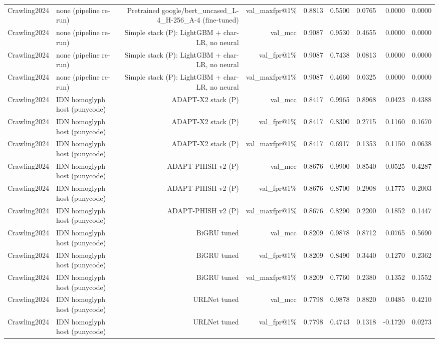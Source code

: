 \begin{table}[t]
\begin{tabular}{llrrrrrrr}
Crawling2024 & none (pipeline re-run) & Pretrained google/bert\_uncased\_L-4\_H-256\_A-4 (fine-tuned) & val\_maxfpr@1\% & 0.8813 & 0.5500 & 0.0765 & 0.0000 & 0.0000 \\
Crawling2024 & none (pipeline re-run) & Simple stack (P): LightGBM + char-LR, no neural & val\_mcc & 0.9087 & 0.9530 & 0.4655 & 0.0000 & 0.0000 \\
Crawling2024 & none (pipeline re-run) & Simple stack (P): LightGBM + char-LR, no neural & val\_fpr@1\% & 0.9087 & 0.7438 & 0.0813 & 0.0000 & 0.0000 \\
Crawling2024 & none (pipeline re-run) & Simple stack (P): LightGBM + char-LR, no neural & val\_maxfpr@1\% & 0.9087 & 0.4660 & 0.0325 & 0.0000 & 0.0000 \\
Crawling2024 & IDN homoglyph host (punycode) & ADAPT-X2 stack (P) & val\_mcc & 0.8417 & 0.9965 & 0.8968 & 0.0423 & 0.4388 \\
Crawling2024 & IDN homoglyph host (punycode) & ADAPT-X2 stack (P) & val\_fpr@1\% & 0.8417 & 0.8300 & 0.2715 & 0.1160 & 0.1670 \\
Crawling2024 & IDN homoglyph host (punycode) & ADAPT-X2 stack (P) & val\_maxfpr@1\% & 0.8417 & 0.6917 & 0.1353 & 0.1150 & 0.0638 \\
Crawling2024 & IDN homoglyph host (punycode) & ADAPT-PHISH v2 (P) & val\_mcc & 0.8676 & 0.9900 & 0.8540 & 0.0525 & 0.4287 \\
Crawling2024 & IDN homoglyph host (punycode) & ADAPT-PHISH v2 (P) & val\_fpr@1\% & 0.8676 & 0.8700 & 0.2908 & 0.1775 & 0.2003 \\
Crawling2024 & IDN homoglyph host (punycode) & ADAPT-PHISH v2 (P) & val\_maxfpr@1\% & 0.8676 & 0.8290 & 0.2200 & 0.1852 & 0.1447 \\
Crawling2024 & IDN homoglyph host (punycode) & BiGRU tuned & val\_mcc & 0.8209 & 0.9878 & 0.8712 & 0.0765 & 0.5690 \\
Crawling2024 & IDN homoglyph host (punycode) & BiGRU tuned & val\_fpr@1\% & 0.8209 & 0.8490 & 0.3440 & 0.1270 & 0.2362 \\
Crawling2024 & IDN homoglyph host (punycode) & BiGRU tuned & val\_maxfpr@1\% & 0.8209 & 0.7760 & 0.2380 & 0.1352 & 0.1552 \\
Crawling2024 & IDN homoglyph host (punycode) & URLNet tuned & val\_mcc & 0.7798 & 0.9878 & 0.8820 & 0.0485 & 0.4210 \\
Crawling2024 & IDN homoglyph host (punycode) & URLNet tuned & val\_fpr@1\% & 0.7798 & 0.4743 & 0.1318 & -0.1720 & 0.0273 \\

\end{tabular}
\end{table}
